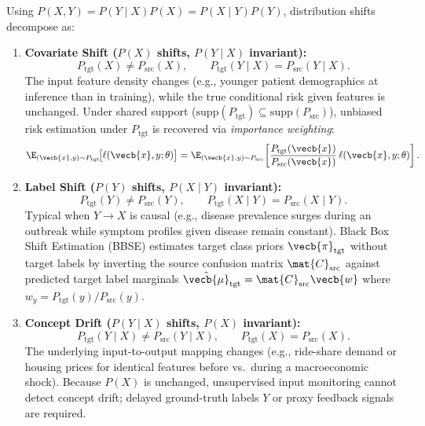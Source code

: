 \documentclass[../../../../master.tex]{subfiles}
\begin{document}
\begin{coremath}
Using $P(X, Y) = P(Y \mid X) P(X) = P(X \mid Y) P(Y)$, distribution shifts decompose as:
\begin{enumerate}
  \item \textbf{Covariate Shift ($P(X)$ shifts, $P(Y \mid X)$ invariant):}
  \begin{equation}\label{eq:mlsys:covariate_shift}
    P_{\mathrm{tgt}}(X) \ne P_{\mathrm{src}}(X), \qquad P_{\mathrm{tgt}}(Y \mid X) = P_{\mathrm{src}}(Y \mid X).
  \end{equation}
  The input feature density changes (e.g., younger patient demographics at inference than in training), while the true conditional risk given features is unchanged. Under shared support ($\mathrm{supp}(P_{\mathrm{tgt}}) \subseteq \mathrm{supp}(P_{\mathrm{src}})$), unbiased risk estimation under $P_{\mathrm{tgt}}$ is recovered via \emph{importance weighting}:
  \begin{equation}\label{eq:mlsys:importance_weight}
    \E_{(\vecb{x}, y) \sim P_{\mathrm{tgt}}}\!\bigl[\ell(\vecb{x}, y; \theta)\bigr] = \E_{(\vecb{x}, y) \sim P_{\mathrm{src}}}\!\left[\frac{P_{\mathrm{tgt}}(\vecb{x})}{P_{\mathrm{src}}(\vecb{x})}\,\ell(\vecb{x}, y; \theta)\right].
  \end{equation}
  \item \textbf{Label Shift ($P(Y)$ shifts, $P(X \mid Y)$ invariant):}
  \begin{equation}\label{eq:mlsys:label_shift}
    P_{\mathrm{tgt}}(Y) \ne P_{\mathrm{src}}(Y), \qquad P_{\mathrm{tgt}}(X \mid Y) = P_{\mathrm{src}}(X \mid Y).
  \end{equation}
  Typical when $Y \to X$ is causal (e.g., disease prevalence surges during an outbreak while symptom profiles given disease remain constant). Black Box Shift Estimation (BBSE) estimates target class priors $\vecb{\pi}_{\mathrm{tgt}}$ without target labels by inverting the source confusion matrix $\mat{C}_{\mathrm{src}}$ against predicted target label marginals $\hat{\vecb{\mu}}_{\mathrm{tgt}} = \mat{C}_{\mathrm{src}} \vecb{w}$ where $w_y = P_{\mathrm{tgt}}(y)/P_{\mathrm{src}}(y)$.
  \item \textbf{Concept Drift ($P(Y \mid X)$ shifts, $P(X)$ invariant):}
  \begin{equation}\label{eq:mlsys:concept_drift}
    P_{\mathrm{tgt}}(Y \mid X) \ne P_{\mathrm{src}}(Y \mid X), \qquad P_{\mathrm{tgt}}(X) = P_{\mathrm{src}}(X).
  \end{equation}
  The underlying input-to-output mapping changes (e.g., ride-share demand or housing prices for identical features before vs.\ during a macroeconomic shock). Because $P(X)$ is unchanged, unsupervised input monitoring cannot detect concept drift; delayed ground-truth labels $Y$ or proxy feedback signals are required.
\end{enumerate}
\end{coremath}
\end{document}
